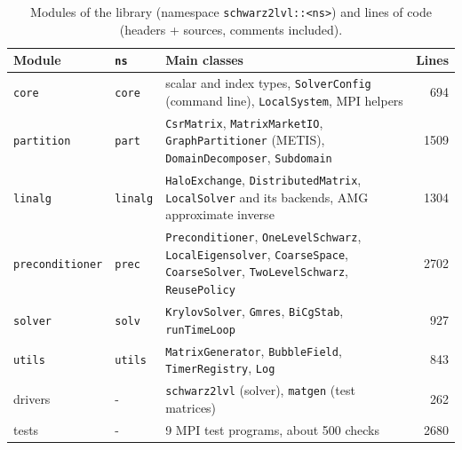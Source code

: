 \documentclass[11pt,a4paper]{article}
\begin{document}
\begin{table}[t]
  \centering\small
  \caption{Modules of the library (namespace \texttt{schwarz2lvl::<ns>}) and lines of code (headers + sources,
  comments included).}\label{tab:modules}
  \begin{tabularx}{\textwidth}{@{}l l X r@{}}
    \toprule
    Module & \texttt{ns} & Main classes & Lines\\
    \midrule
    \texttt{core} & \texttt{core} & scalar and index types, \texttt{SolverConfig} (command line), \texttt{LocalSystem}, MPI helpers & 694\\
    \texttt{partition} & \texttt{part} & \texttt{CsrMatrix}, \texttt{MatrixMarketIO}, \texttt{GraphPartitioner} (METIS), \texttt{DomainDecomposer}, \texttt{Subdomain} & 1509\\
    \texttt{linalg} & \texttt{linalg} & \texttt{HaloExchange}, \texttt{DistributedMatrix}, \texttt{LocalSolver} and its backends, AMG approximate inverse & 1304\\
    \texttt{preconditioner} & \texttt{prec} & \texttt{Preconditioner}, \texttt{OneLevelSchwarz}, \texttt{LocalEigensolver}, \texttt{CoarseSpace}, \texttt{CoarseSolver}, \texttt{TwoLevelSchwarz}, \texttt{ReusePolicy} & 2702\\
    \texttt{solver} & \texttt{solv} & \texttt{KrylovSolver}, \texttt{Gmres}, \texttt{BiCgStab}, \texttt{runTimeLoop} & 927\\
    \texttt{utils} & \texttt{utils} & \texttt{MatrixGenerator}, \texttt{BubbleField}, \texttt{TimerRegistry}, \texttt{Log} & 843\\
    \midrule
    drivers & - & \texttt{schwarz2lvl} (solver), \texttt{matgen} (test matrices) & 262\\
    tests & - & 9 MPI test programs, about 500 checks & 2680\\
    \bottomrule
  \end{tabularx}
\end{table}
\end{document}
